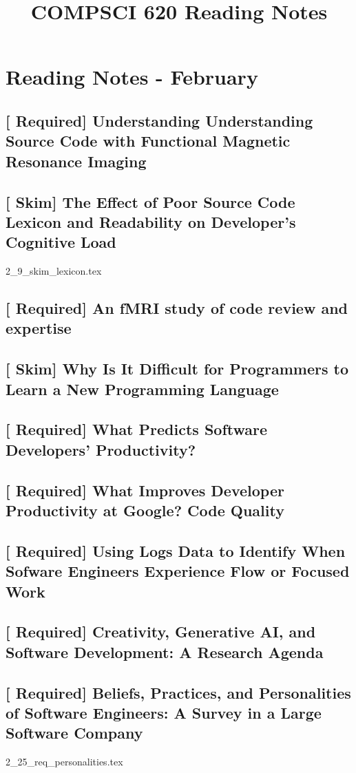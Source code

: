 \documentclass[oneside]{book}      %
\title{COMPSCI 620 Reading Notes}  %
\newcommand{\reqchap}[1]{\chapter{\texorpdfstring{[{\color{red} Required}] #1}{#1}}}
\newcommand{\skimchap}[1]{\chapter{\texorpdfstring{[{\color{ForestGreen} Skim}] #1}{#1}}}
\begin{document}

\maketitle                   %

\tableofcontents

\part{Reading Notes - February}
\reqchap{Understanding Understanding Source Code with Functional Magnetic Resonance Imaging}


\begin{refsection}
    \skimchap{The Effect of Poor Source Code Lexicon and Readability on Developer's Cognitive Load}
    {2_9_skim_lexicon.tex}
    \printbibliography[heading=subbibliography,title={References}]
\end{refsection}

\reqchap{An fMRI study of code review and expertise}


\skimchap{Why Is It Difficult for Programmers to Learn a New Programming Language}


\reqchap{What Predicts Software Developers' Productivity?}


\reqchap{What Improves Developer Productivity at Google? Code Quality}


\reqchap{Using Logs Data to Identify When Sofware Engineers Experience Flow or Focused Work}


\begin{refsection}
    \reqchap{Creativity, Generative AI, and Software Development: A Research Agenda}
    
    \printbibliography[heading=subbibliography,title={References}]
\end{refsection}

\begin{refsection}
    \reqchap{Beliefs, Practices, and Personalities of Software Engineers: A Survey in a Large Software Company}
    {2_25_req_personalities.tex}
    \printbibliography[heading=subbibliography,title={References}]
\end{refsection}
\end{document}
